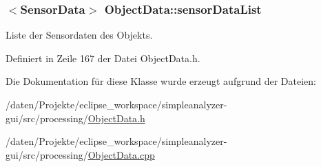 \hypertarget{classObjectData_af6a1dcb4e137b1698422a912c07c7f39}{
\subsubsection[{sensor\-Data\-List}]{$<${\bf Sensor\-Data}$>$ Object\-Data\-::sensor\-Data\-List\hspace{0.3cm}{\ttfamily [private]}}}\label{classObjectData_af6a1dcb4e137b1698422a912c07c7f39}


Liste der Sensordaten des Objekts. 



Definiert in Zeile 167 der Datei Object\-Data.\-h.



Die Dokumentation für diese Klasse wurde erzeugt aufgrund der Dateien\-:\begin{DoxyCompactItemize}
\item 
/daten/\-Projekte/eclipse\-\_\-workspace/simpleanalyzer-\/gui/src/processing/\hyperlink{ObjectData_8h}{Object\-Data.\-h}\item 
/daten/\-Projekte/eclipse\-\_\-workspace/simpleanalyzer-\/gui/src/processing/\hyperlink{ObjectData_8cpp}{Object\-Data.\-cpp}\end{DoxyCompactItemize}
